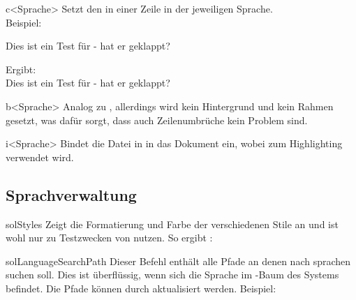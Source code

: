 \documentclass{sopra-base}
\begin{document}
\begin{command}{c<Sprache>}{}
    Setzt den  in einer Zeile in der jeweiligen Sprache. \\
    Beispiel:
    \begin{plainlatex}
Dies ist ein Test für  - hat er geklappt?
    \end{plainlatex}
    Ergibt: \\ 
Dies ist ein Test für  - hat er geklappt?
\end{command}

\begin{command}{b<Sprache>}{}
   Analog zu , allerdings wird kein Hintergrund und kein Rahmen gesetzt, was dafür sorgt, dass auch Zeilenumbrüche kein Problem sind.
\end{command}

\begin{command}{i<Sprache>}{}
    Bindet die Datei in  in das Dokument ein, wobei  zum Highlighting verwendet wird.
 \end{command}
 
\subsection{Sprachverwaltung}

\begin{command}{solStyles}{}
    Zeigt die Formatierung und Farbe der verschiedenen Stile an und ist wohl nur zu Testzwecken von nutzen. So ergibt : \solStyles
\end{command}

\begin{command}{solLanguageSearchPath}{}
    Dieser Befehl enthält alle Pfade an denen  nach sprachen suchen soll. Dies ist überflüssig, wenn sich die Sprache im -Baum des Systems befindet. Die Pfade können durch  aktualisiert werden. Beispiel:
\begin{plainlatex}
\renewcommand{\solLanguageSearchPath}{{OrdnerA/}{OrdnerB/UnterordnerA/}{/home/}}
\end{plainlatex}
\end{command}
\end{document}
